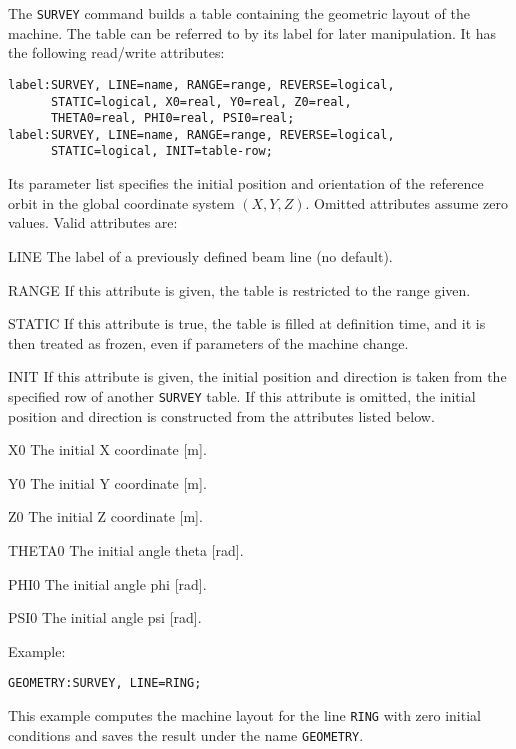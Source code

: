 The \texttt{SURVEY} command builds a table containing the geometric layout
of the machine.
The table can be referred to by its label for later manipulation.
It has the following read/write attributes:
\begin{verbatim}
label:SURVEY, LINE=name, RANGE=range, REVERSE=logical,
      STATIC=logical, X0=real, Y0=real, Z0=real,
      THETA0=real, PHI0=real, PSI0=real;
label:SURVEY, LINE=name, RANGE=range, REVERSE=logical,
      STATIC=logical, INIT=table-row;
\end{verbatim}
Its parameter list specifies the initial position and orientation
of the reference orbit in the global coordinate system 
$(X,Y,Z)$.
Omitted attributes assume zero values.
Valid attributes are:
\begin{kdescription}
\item[LINE]
  The label of a previously defined beam line (no default).
\item[RANGE]
  If this attribute is given, the table is restricted to the range given.
\item[STATIC]
  If this attribute is true, the table is filled at definition time,
  and it is then treated as frozen, even if parameters of the machine change.
\item[INIT]
  If this attribute is given, the initial position and direction is taken
  from the specified row of another \texttt{SURVEY} table.
  If this attribute is omitted, the initial position and direction is
  constructed from the attributes listed below.
\item[X0]
  The initial X coordinate [m].
\item[Y0]
  The initial Y coordinate [m].
\item[Z0]
  The initial Z coordinate [m].
\item[THETA0]
  The initial angle theta [rad].
\item[PHI0]
  The initial angle phi [rad].
\item[PSI0]
  The initial angle psi [rad].
\end{kdescription}

Example:
\begin{verbatim}
GEOMETRY:SURVEY, LINE=RING;
\end{verbatim}
This example computes the machine layout for the line \texttt{RING} with
zero initial conditions and saves the result under the name
\texttt{GEOMETRY}.

